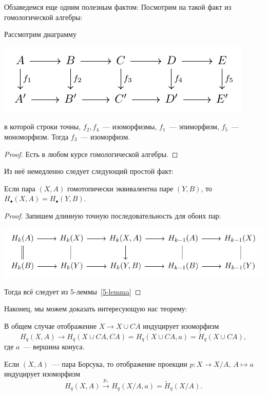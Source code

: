     Обзаведемся еще одним полезным фактом:
    Посмотрим на такой факт из гомологической алгебры:

    \begin{lemma}[5-лемма]\label{5-lemma}
        Рассмотрим диаграмму
        \begin{center}
            \includegraphics{lectures/0/pictures/cd_7}
        \end{center}
        в которой строки точны, $f_2, f_4$~--- изоморфизмы, $f_1$~--- эпиморфизм, $f_5$~--- мономорфизм.
        Тогда $f_3$~--- изоморфизм.
    \end{lemma}
    \begin{proof}
        Есть в любом курсе гомологической алгебры.
    \end{proof}

    Из неё немедленно следует следующий простой факт:

    \begin{lemma}\label{HomotopyEquivalencePair}
        Если пара $(X, A)$ гомотопически эквивалентна паре $(Y, B)$, то $H_{\bullet}(X, A) = H_{\bullet}(Y, B)$.
    \end{lemma}
    \begin{proof}
        Запишем длинную точную последовательность для обоих пар:
        \begin{center}
            \includegraphics{lectures/0/pictures/cd_8}
        \end{center}
        Тогда всё следует из 5-леммы~\ref{5-lemma}
    \end{proof}

    Наконец, мы можем доказать интересующую нас теорему:

    \begin{theorem}\label{FactorizationTheorem}
        В общем случае отображение $X \to X \cup CA$ индуцирует изоморфизм
        \[ H_{q}(X, A) \to H_{q}(X \cup CA, CA) = H_{q}(X \cup CA, a) = \widetilde{H}_{q}(X \cup CA), \]
        где $a$~--- вершина конуса.

        Если $(X, A)$~--- пара Борсука, то отображение проекции $p\colon X \to X/A, \ A \mapsto a$ индуцирует изоморфизм
        \[ H_{q}(X, A) \xrightarrow{p_{*}} H_{q}(X/A, a) = \widetilde{H}_{q}(X/A). \]
    \end{theorem}

